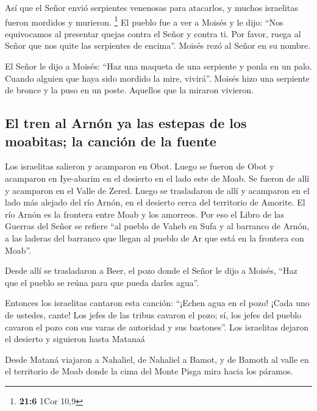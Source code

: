  Así que el Señor envió serpientes venenosas para
atacarlos, y muchos israelitas fueron mordidos y murieron. \footnote{\textbf{21:6}
  1Cor 10,9}  El pueblo fue a ver a Moisés y le dijo:
``Nos equivocamos al presentar quejas contra el Señor y contra ti. Por
favor, ruega al Señor que nos quite las serpientes de encima''. Moisés
rezó al Señor en su nombre.

 El Señor le dijo a Moisés: ``Haz una maqueta de una
serpiente y ponla en un palo. Cuando alguien que haya sido mordido la
mire, vivirá''.  Moisés hizo una serpiente de bronce y la
puso en un poste. Aquellos que la miraron vivieron.

\hypertarget{el-tren-al-arnuxf3n-ya-las-estepas-de-los-moabitas-la-canciuxf3n-de-la-fuente}{%
\subsection{El tren al Arnón ya las estepas de los moabitas; la canción
de la
fuente}\label{el-tren-al-arnuxf3n-ya-las-estepas-de-los-moabitas-la-canciuxf3n-de-la-fuente}}

 Los israelitas salieron y acamparon en Obot.
 Luego se fueron de Obot y acamparon en Iye-abarim en el
desierto en el lado este de Moab.  Se fueron de allí y
acamparon en el Valle de Zered.  Luego se trasladaron de
allí y acamparon en el lado más alejado del río Arnón, en el desierto
cerca del territorio de Amorite. El río Arnón es la frontera entre Moab
y los amorreos.  Por eso el Libro de las Guerras del
Señor se refiere ``al pueblo de Vaheb en Sufa y al barranco de Arnón,
 a las laderas del barranco que llegan al pueblo de Ar
que está en la frontera con Moab''.

 Desde allí se trasladaron a Beer, el pozo donde el Señor
le dijo a Moisés, ``Haz que el pueblo se reúna para que pueda darles
agua''.

 Entonces los israelitas cantaron esta canción: ``¡Echen
agua en el pozo! ¡Cada uno de ustedes, cante!  Los jefes
de las tribus cavaron el pozo; sí, los jefes del pueblo cavaron el pozo
con sus varas de autoridad y sus bastones''. Los israelitas dejaron el
desierto y siguieron hasta Matanaá

 Desde Mataná viajaron a Nahaliel, de Nahaliel a Bamot,
 y de Bamoth al valle en el territorio de Moab donde la
cima del Monte Pisga mira hacia los páramos.


